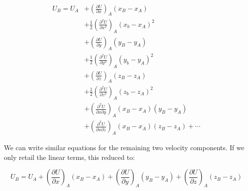 \begin{equation}
\begin{aligned}
U_B = U_A & + \left(\frac{\partial U}{\partial x}\right)_A (x_B - x_A) \\
    & + \frac{1}{2}\left(\frac{\partial^2 U}{\partial x^2}\right)_A (x_b - x_A)^2 \\
    & + \left(\frac{\partial U}{\partial y}\right)_A (y_B - y_A) \\
    & + \frac{1}{2}\left(\frac{\partial^2 U}{\partial y^2}\right)_A (y_b - y_A)^2 \\
    & + \left(\frac{\partial U}{\partial z}\right)_A (z_B - z_A) \\
    & + \frac{1}{2}\left(\frac{\partial^2 U}{\partial z^2}\right)_A (z_b - z_A)^2 \\
    & + \left(\frac{\partial^2 U}{\partial x \partial y}\right)_A (x_B - x_A)(y_B - y_A) \\
    & + \left(\frac{\partial^2 U}{\partial x \partial z}\right)_A (x_B - x_A)(z_B - z_A) + \cdots
\end{aligned}
\end{equation}

We can write similar equations for the remaining two velocity components. If we only retail the linear terms, this reduced to:

\begin{equation}
U_B = U_A + \left(\frac{\partial U}{\partial x}\right)_A (x_B - x_A)  + \left(\frac{\partial U}{\partial y}\right)_A (y_B - y_A)  + \left(\frac{\partial U}{\partial z}\right)_A (z_B - z_A)
\end{equation}
